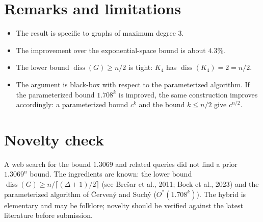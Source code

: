 \documentclass[11pt]{article}
\begin{document}
\section{Remarks and limitations}

\begin{itemize}
\item The result is specific to graphs of maximum degree 3.
\item The improvement over the exponential-space bound is about $4.3\%$.
\item The lower bound $\operatorname{diss}(G) \ge n/2$ is tight: $K_4$ has
      $\operatorname{diss}(K_4)=2=n/2$.
\item The argument is black-box with respect to the parameterized algorithm. If the
      parameterized bound $1.708^k$ is improved, the same construction improves
      accordingly: a parameterized bound $c^k$ and the bound $k \le n/2$ give
      $c^{n/2}$.
\end{itemize}

\section{Novelty check}

A web search for the bound $1.3069$ and related queries did not find a prior
$1.3069^n$ bound. The ingredients are known: the lower bound
$\operatorname{diss}(G) \ge n/\lceil(\Delta+1)/2\rceil$ (see Bre\v{s}ar et al., 2011;
Bock et al., 2023) and
the parameterized algorithm of \v{C}erven\'y and Such\'y ($O^*(1.708^k)$). The hybrid
is elementary and may be folklore; novelty should be verified against the latest
literature before submission.
\end{document}
